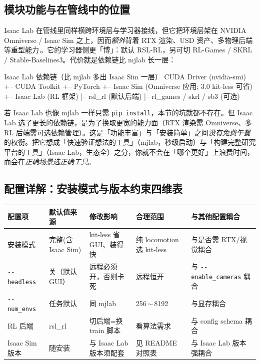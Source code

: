 \subsection{模块功能与在管线中的位置}

Isaac Lab 在管线里同样横跨环境层与学习器接线，但它把环境层架在 NVIDIA Omniverse / Isaac Sim 之上，因而\emph{额外}背着 RTX 渲染、USD 资产、多物理后端等重型能力\,\cite{isaaclab2024}。它的学习器侧更「博」：默认 RSL-RL，另可切 RL-Games / SKRL / Stable-Baselines3。代价就是依赖链比 mjlab 长一层：

\begin{codebox}[text]{Isaac Lab 依赖链（比 mjlab 多出 Isaac Sim 一层）}
CUDA Driver (nvidia-smi)
  +-- CUDA Toolkit
        +-- PyTorch
              +-- Isaac Sim (Omniverse 应用; 3.0 kit-less 可省)
                    +-- Isaac Lab (RL 框架)
                          |-- rsl_rl (默认后端)
                          |-- rl_games / skrl / sb3 (可选)
\end{codebox}

\begin{insight}\label{ins:rlmc-tradeoff}
若 Isaac Lab 也像 mjlab 一样只需 \verb|pip install|，本节的坑就都不存在。但 Isaac Lab 选了更长的依赖链，是为了换取更宽的能力面（RTX 渲染需 Omniverse、多 RL 后端需可选依赖管理）。这是「功能丰富」与「安装简单」之间\emph{没有免费午餐}的权衡。把它想成「快速验证想法的工具」（mjlab，秒级启动）与「构建完整研究平台的工具」（Isaac Lab，生态全）之分，你就不会在「哪个更好」上浪费时间，而会在\emph{正确场景选正确工具}。
\end{insight}

\subsection{配置详解：安装模式与版本约束四维表}

\begin{center}
\small
\begin{tabular}{@{}p{2.4cm}p{2.4cm}p{3.0cm}p{2.6cm}p{2.6cm}@{}}
\toprule
配置项 & 默认值来源 & 修改影响 & 合理范围 & 与其他配置耦合 \\
\midrule
安装模式 & 完整(含 Isaac Sim) & kit-less 省 GUI、装得快 & 纯 locomotion 选 kit-less & 与是否需 RTX/视觉耦合 \\
\verb|--headless| & 关（默认 GUI） & 远程必须开，否则卡死 & 远程恒开 & 与 \verb|--enable_cameras| 耦合 \\
\verb|--num_envs| & 任务默认 & 同 mjlab & 256\,$\sim$\,8192 & 与显存耦合 \\
RL 后端 & rsl\_rl & 切后端=换 train 脚本 & 看算法需求 & 与 config schema 耦合 \\
Isaac Sim 版本 & 随安装 & 与 Isaac Lab 版本须配套 & 见 README 对照表 & 与 Isaac Lab 版本强耦合 \\
\bottomrule
\end{tabular}
\end{center}

